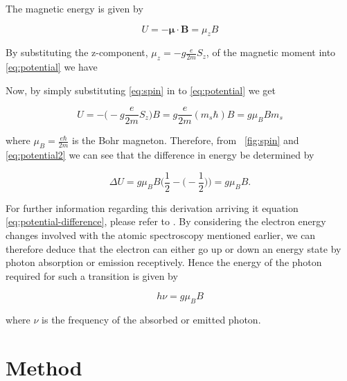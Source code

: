 \documentclass{article}
\newcommand{\figref}[2][\figurename~]{#1\ref{#2}}
\begin{document}
\vspace{2mm}
\noindent
The magnetic energy is given by \cite{Paper02}

\begin{equation}
\label{eq:potential}
U = -\boldsymbol{\mu} \cdot \textbf{B} = \mu_zB
\end{equation}

\vspace{2mm}
\noindent
By substituting the z-component, $\mu_z = -g\frac{e}{2m}S_z$, of the magnetic moment into \eqref{eq:potential} we have

\vspace{2mm}
\noindent
Now, by simply substituting \eqref{eq:spin} in to \eqref{eq:potential} we get

\begin{equation}
\label{eq:potential2}
U = -\Big(-g\frac{e}{2m}S_z\Big)B = g\frac{e}{2m}(m_s\hbar)B = g\mu_BBm_s
\end{equation}

\vspace{2mm}
\noindent
where $\mu_B = \frac{e\hbar}{2m}$ is the Bohr magneton. Therefore, from \figref{fig:spin} and \eqref{eq:potential2} we can see that the difference in energy be determined by \cite{Paper02}

\begin{equation}
\label{eq:potential-difference}
\Delta U = g\mu_BB\Big(\frac{1}{2} - \Big(-\frac{1}{2}\Big)\Big) = g\mu_BB.
\end{equation}

\vspace{2mm}
\noindent
For further information regarding this derivation arriving it equation \eqref{eq:potential-difference}, please refer to \cite{Book01}. By considering the electron energy changes involved with the atomic spectroscopy mentioned earlier, we can therefore deduce that the electron can either go up or down an energy state by photon absorption or emission receptively. Hence the energy of the photon required for such a transition is given by

\begin{equation}
\label{eq:frequency-equation}
h\nu = g\mu_BB
\end{equation}

\vspace{2mm}
\noindent
where $\nu$ is the frequency of the absorbed or emitted photon. 

 
\section{Method}
\label{sec:method}
\end{document}
